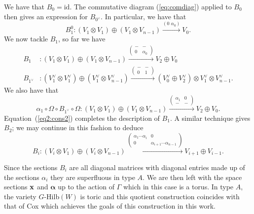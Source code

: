 \documentclass{amsart}
\newcommand{\balpha}{\boldsymbol{\alpha}}
\theoremstyle{definition}
\begin{document}
We have that $B_0 = \text{id}$.
The commutative diagram (\ref{eq:comdiag}) applied to $B_0$ then gives an expression for $B_{0^\vee}$.
In particular, we have that 
$$B_1^0 \colon (V_1 \otimes V_1) \oplus (V_1 \otimes V_{n-1}) \xrightarrow{(0\,\, \alpha_0)} V_0.$$
We now tackle $B_1$, so far we have 
\begin{align*}
    B_1 &\colon (V_1 \otimes V_1) \oplus (V_1 \otimes V_{n-1}) \xrightarrow{\begin{pmatrix} - & - \\ 0 & \alpha_0 \end{pmatrix}} V_2 \oplus V_0 \\
    B_{1^\vee} &\colon (V_1^\vee \otimes V_1^\vee) \oplus (V_1^\vee \otimes V_{n-1}^\vee) \xrightarrow{\begin{pmatrix} - & - \\ 0 & 1 \end{pmatrix}} (V_0^\vee \oplus V_2^\vee) \otimes V_1^\vee \otimes V_{n-1}^\vee.
\end{align*}
We also have that
$$\alpha_1 \circ \Omega \circ B_{1^\vee} \circ \Omega \colon (V_1 \otimes V_1) \oplus (V_1 \otimes V_{n-1}) \xrightarrow{\begin{pmatrix} \alpha_1 & 0 \\ - & - \end{pmatrix}} V_2 \oplus V_0.$$
Equation~(\ref{eq2:cons2}) completes the description of $B_1$.
A similar technique gives $B_2$; we may continue in this fashion to deduce 
$$B_i \colon (V_i \otimes V_1) \oplus (V_i \otimes V_{n-1}) \xrightarrow{\begin{pmatrix} \alpha_1\cdots\alpha_i & 0 \\ 0 & \alpha_{i+1}\cdots\alpha_{n-1} \end{pmatrix}} V_{i+1} \oplus V_{i-1}.$$

Since the sections $B_i$ are all diagonal matrices with diagonal entries made up of the sections $\alpha_i$ they are superfluous in type $A$.
We are then left with the space sections $\mathbf{x}$ and $\balpha$ up to the action of $\Gamma$ which in this case is a torus.
In type $A$, the variety $G$-Hilb$(W)$ is toric and this quotient construction coincides with that of Cox which achieves the goals of this construction in this work.
\end{document}
